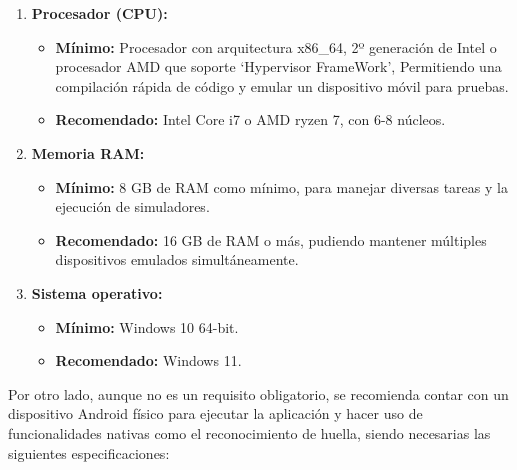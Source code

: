 \begin{enumerate}

\item\textbf{Procesador (CPU):}
	\begin{itemize}
	\item\textbf{Mínimo:} Procesador con arquitectura x86\_64, 2º generación de Intel o procesador AMD que
	 soporte `Hypervisor FrameWork', Permitiendo una compilación rápida de código y emular un dispositivo 	
	 móvil para pruebas.
	\item\textbf{Recomendado:} Intel Core i7 o AMD ryzen 7, con 6-8 núcleos.
	\end{itemize}
	
\item\textbf{Memoria RAM:}
	\begin{itemize}
	\item\textbf{Mínimo:} 8 GB de RAM como mínimo, para manejar diversas tareas y la ejecución de
	simuladores.
	\item\textbf{Recomendado:} 16 GB de RAM o más, pudiendo mantener múltiples dispositivos emulados
	simultáneamente.
	\end{itemize}
	
\item\textbf{Sistema operativo:}
	\begin{itemize}
	\item\textbf{Mínimo:} Windows 10 64-bit.
	\item\textbf{Recomendado:} Windows 11.
	\end{itemize}

\end{enumerate}

Por otro lado, aunque no es un requisito obligatorio, se recomienda contar con un dispositivo Android físico para ejecutar la aplicación y hacer uso de funcionalidades nativas como el reconocimiento de huella, siendo necesarias las siguientes especificaciones:


